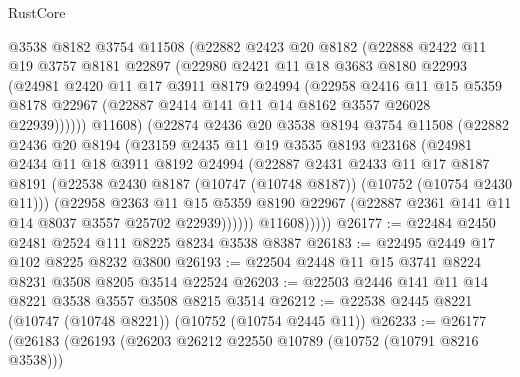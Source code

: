 \begin{lexlean}{RustCore}
\begin{coremodule}
              @3538
              @8182
              @3754
              @11508
              (@22882
                @2423
                @20
                @8182
                (@22888
                  @2422
                  @11
                  @19
                  @3757
                  @8181
                  @22897
                  (@22980
                    @2421
                    @11
                    @18
                    @3683
                    @8180
                    @22993
                    (@24981
                      @2420
                      @11
                      @17
                      @3911
                      @8179
                      @24994
                      (@22958
                        @2416
                        @11
                        @15
                        @5359
                        @8178
                        @22967
                        (@22887 @2414 @141 @11 @14 @8162 @3557 @26028 @22939))))))
              @11608)
            (@22874
              @2436
              @20
              @3538
              @8194
              @3754
              @11508
              (@22882
                @2436
                @20
                @8194
                (@23159
                  @2435
                  @11
                  @19
                  @3535
                  @8193
                  @23168
                  (@24981
                    @2434
                    @11
                    @18
                    @3911
                    @8192
                    @24994
                    (@22887
                      @2431
                      @2433
                      @11
                      @17
                      @8187
                      @8191
                      (@22538 @2430 @8187 (@10747 (@10748 @8187)) (@10752 (@10754 @2430 @11)))
                      (@22958
                        @2363
                        @11
                        @15
                        @5359
                        @8190
                        @22967
                        (@22887 @2361 @141 @11 @14 @8037 @3557 @25702 @22939))))))
              @11608)))))
@26177 := @22484 @2450 @2481 @2524 @111 @8225 @8234 @3538 @8387
@26183 := @22495 @2449 @17 @102 @8225 @8232 @3800
@26193 := @22504 @2448 @11 @15 @3741 @8224 @8231 @3508 @8205 @3514 @22524
@26203 := @22503 @2446 @141 @11 @14 @8221 @3538 @3557 @3508 @8215 @3514
@26212 := @22538 @2445 @8221 (@10747 (@10748 @8221)) (@10752 (@10754 @2445 @11))
@26233 := @26177
    (@26183
      (@26193
        (@26203 @26212 @22550 @10789 (@10752 (@10791 @8216 @3538)))

\end{coremodule}
\end{lexlean}
